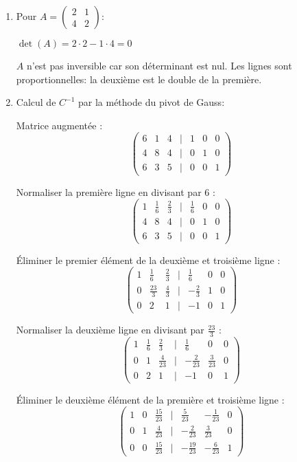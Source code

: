 \documentclass[10pt,a4paper]{article}
\begin{document}
\begin{enumerate}
    \item Pour $A = \begin{pmatrix} 2 & 1 \\ 4 & 2 \end{pmatrix}$:

    $\det(A) = 2 \cdot 2 - 1 \cdot 4 = 0$

    $A$ n'est pas inversible car son déterminant est nul. Les lignes sont proportionnelles: la deuxième est le double de la première.

    \item Calcul de $C^{-1}$ par la méthode du pivot de Gauss:

    Matrice augmentée :
    $$
    \begin{pmatrix}
    6 & 1 & 4 & | & 1 & 0 & 0 \\
    4 & 8 & 4 & | & 0 & 1 & 0 \\
    6 & 3 & 5 & | & 0 & 0 & 1
    \end{pmatrix}
    $$

    Normaliser la première ligne en divisant par 6 :
    $$
    \begin{pmatrix}
    1 & \frac{1}{6} & \frac{2}{3} & | & \frac{1}{6} & 0 & 0 \\
    4 & 8 & 4 & | & 0 & 1 & 0 \\
    6 & 3 & 5 & | & 0 & 0 & 1
    \end{pmatrix}
    $$

    Éliminer le premier élément de la deuxième et troisième ligne :
    $$
    \begin{pmatrix}
    1 & \frac{1}{6} & \frac{2}{3} & | & \frac{1}{6} & 0 & 0 \\
    0 & \frac{23}{3} & \frac{4}{3} & | & -\frac{2}{3} & 1 & 0 \\
    0 & 2 & 1 & | & -1 & 0 & 1
    \end{pmatrix}
    $$

    Normaliser la deuxième ligne en divisant par $\frac{23}{3}$ :
    $$
    \begin{pmatrix}
    1 & \frac{1}{6} & \frac{2}{3} & | & \frac{1}{6} & 0 & 0 \\
    0 & 1 & \frac{4}{23} & | & -\frac{2}{23} & \frac{3}{23} & 0 \\
    0 & 2 & 1 & | & -1 & 0 & 1
    \end{pmatrix}
    $$

    Éliminer le deuxième élément de la première et troisième ligne :
    $$
    \begin{pmatrix}
    1 & 0 & \frac{15}{23} & | & \frac{5}{23} & -\frac{1}{23} & 0 \\
    0 & 1 & \frac{4}{23} & | & -\frac{2}{23} & \frac{3}{23} & 0 \\
    0 & 0 & \frac{15}{23} & | & -\frac{19}{23} & -\frac{6}{23} & 1
    \end{pmatrix}
    $$


\end{enumerate}
\end{document}
